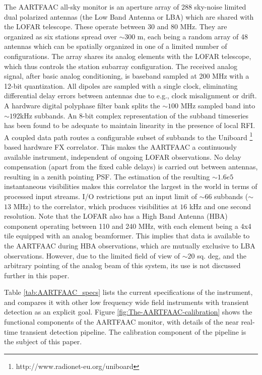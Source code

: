 \documentclass{aa}
\begin{document}
The AARTFAAC all-sky monitor is an  aperture array of 288 sky-noise limited dual
polarized antennas (the Low Band Antenna or LBA) which are shared with the LOFAR
telescope.  These  operate between  30 and  80 MHz.  They  are organized  as six
stations spread  over $\sim$$300$ m,  each being a  random array of  48 antennas
which can be  spatially organized in one of a  limited number of configurations.
The  array shares  its  analog elements  with  the LOFAR  telescope, which  thus
controls the station subarray  configuration.  The received analog signal, after
basic  analog  conditioning,  is baseband  sampled  at  200  MHz with  a  12-bit
quantization.   All  dipoles  are  sampled  with  a  single  clock,  eliminating
differential delay  errors between antennas  due to e.g., clock  misalignment or
drift.   A hardware  digital polyphase  filter bank  splits the  $\sim$$100$ MHz
sampled band  into $\sim$$192$kHz subbands.  An 8-bit  complex representation of
the subband  timeseries has been found  to be adequate to  maintain linearity in
the presence of local RFI.  A  coupled data path routes a configurable subset of
subbands  to the  Uniboard  \footnote{http://www.radionet-eu.org/uniboard} based
hardware  FX  correlator.  This  makes  the  AARTFAAC  a continuously  available
instrument, independent  of ongoing  LOFAR observations.  No  delay compensation
(apart from the  fixed cable delays) is carried  out between antennas, resulting
in  a  zenith pointing  PSF.   The  estimation  of the  resulting  $\sim$$1.6e5$
instantaneous  visibilities makes this correlator  the largest  in the  world in
terms  of  processed input  streams.  I/O restrictions  put  an  input limit  of
$\sim$$66$  subbands   ($\sim$$13$  MHz)  to  the   correlator,  which  produces
visibilities at $16$ kHz and one second resolution. Note that the LOFAR also has
a High Band Antenna (HBA) component operating between 110 and 240 MHz, with each
element being a  4x4 tile equipped with an analog  beamformer. This implies that
data is  available to the AARTFAAC  during HBA observations,  which are mutually
exclusive to  LBA observations.  However,  due to the  limited field of  view of
$\sim$$20$  sq. deg,  and the  arbitrary  pointing of  the analog  beam of  this
system, its use is not discussed further in this paper.

Table   \ref{tab:AARTFAAC_specs}  lists  the   current  specifications   of  the
instrument, and  compares it  with other low  frequency wide  field instruments
with     transient     detection     as     an    explicit     goal.      Figure
\ref{fig:The-AARTFAAC-calibration}  shows  the   functional  components  of  the
AARTFAAC  monitor,  with  details  of  the near  real-time  transient  detection
pipeline.  The  calibration component of the pipeline is  the subject of this
paper.
\end{document}
